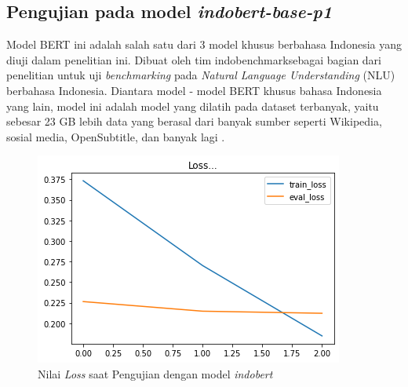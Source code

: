 \subsection{Pengujian pada model \textit{indobert-base-p1}}

Model BERT ini adalah salah satu dari 3 model khusus berbahasa Indonesia yang diuji dalam penelitian ini. Dibuat oleh tim indobenchmarksebagai bagian dari penelitian untuk uji \textit{benchmarking} pada \textit{Natural Language Understanding} (NLU) berbahasa Indonesia. Diantara model - model BERT khusus bahasa Indonesia yang lain, model ini adalah model yang dilatih pada dataset terbanyak, yaitu sebesar 23 GB lebih data yang berasal dari banyak sumber seperti Wikipedia, sosial media, OpenSubtitle, dan banyak lagi \cite{koto2020indolem}.

\begin{figure}[h]
    \begin{center}
        \includegraphics[width= 0.9\linewidth]{gambar/loss_concat_awal.png}
        \caption{Nilai \textit{Loss} saat Pengujian dengan model \textit{indobert}}
        \label{fig: loss_bert_indobert}
    \end{center}
\end{figure}

